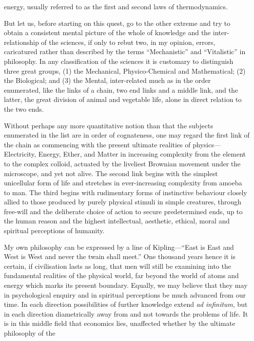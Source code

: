 \documentclass[10.5pt,twoside]{book}
\newcommand{\origpage}[1]{\clearpage\setcounter{page}{#1}}
\begin{document}
\origpage{5}

\noindent energy, usually referred to as the first and second laws of
thermodynamics.

But let us, before starting on this quest, go to the other extreme and try to
obtain a consistent mental picture of the whole of knowledge and the
inter-relationship of the sciences, if only to rebut two, in my opinion,
errors, caricatured rather than described by the terms ``Mechanistic'' and
``Vitalistic'' in philosophy. In any classification of the sciences it is
customary to distinguish three great groups, (1) the Mechanical,
Physico-Chemical and Mathematical; (2) the Biological; and (3) the Mental,
inter-related much as in the order enumerated, like the links of a chain, two
end links and a middle link, and the latter, the great division of animal and
vegetable life, alone in direct relation to the two ends.

Without perhaps any more quantitative notion than that the subjects enumerated
in the list are in order of cognateness, one may regard the first link of the
chain as commencing with the present ultimate realities of
physics---Electricity, Energy, Ether, and Matter in increasing complexity from
the element to the complex colloid, actuated by the liveliest Brownian
movement under the microscope, and yet not alive. The second link begins with
the simplest unicellular form of life and stretches in ever-increasing
complexity from amoeba to man. The third begins with rudimentary forms of
instinctive behaviour closely allied to those produced by purely physical
stimuli in simple creatures, through free-will and the deliberate choice of
action to secure predetermined ends, up to the human reason and the highest
intellectual, aesthetic, ethical, moral and spiritual perceptions of humanity.

My own philosophy can be expressed by a line of Kipling---``East is East and
West is West and never the twain shall meet.'' One thousand years hence it is
certain, if civilisation lasts as long, that men will still be examining into
the fundamental realities of the physical world, far beyond the world of atoms
and energy which marks its present boundary. Equally, we may believe that they
may in psychological enquiry and in spiritual perceptions be much advanced
from our time. In each direction possibilities of further knowledge extend
\textit{ad infinitum}, but in each direction diametrically away from and not
towards the problems of life. It is in this middle field that economics lies,
unaffected whether by the ultimate philosophy of the
\end{document}
